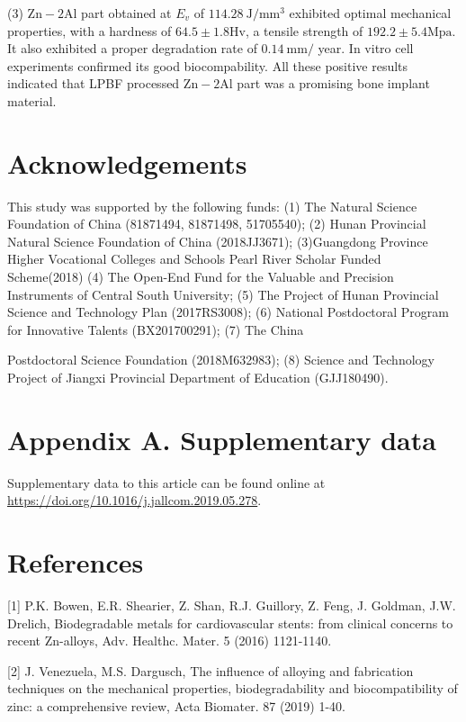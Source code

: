 \documentclass[10pt]{article}
\begin{document}
(3) $\mathrm{Zn}-2 \mathrm{Al}$ part obtained at $E_{v}$ of $114.28 \mathrm{~J} / \mathrm{mm}^{3}$ exhibited optimal mechanical properties, with a hardness of $64.5 \pm 1.8 \mathrm{Hv}$, a tensile strength of $192.2 \pm 5.4 \mathrm{Mpa}$. It also exhibited a proper degradation rate of $0.14 \mathrm{~mm} /$ year. In vitro cell experiments confirmed its good biocompability. All these positive results indicated that LPBF processed $\mathrm{Zn}-2 \mathrm{Al}$ part was a promising bone implant material.

\section*{Acknowledgements}
This study was supported by the following funds: (1) The Natural Science Foundation of China (81871494, 81871498, 51705540); (2) Hunan Provincial Natural Science Foundation of China (2018JJ3671); (3)Guangdong Province Higher Vocational Colleges and Schools Pearl River Scholar Funded Scheme(2018) (4) The Open-End Fund for the Valuable and Precision Instruments of Central South University; (5) The Project of Hunan Provincial Science and Technology Plan (2017RS3008); (6) National Postdoctoral Program for Innovative Talents (BX201700291); (7) The China

Postdoctoral Science Foundation (2018M632983); (8) Science and Technology Project of Jiangxi Provincial Department of Education (GJJ180490).

\section*{Appendix A. Supplementary data}
Supplementary data to this article can be found online at \href{https://doi.org/10.1016/j.jallcom.2019.05.278}{https://doi.org/10.1016/j.jallcom.2019.05.278}.

\section*{References}
[1] P.K. Bowen, E.R. Shearier, Z. Shan, R.J. Guillory, Z. Feng, J. Goldman, J.W. Drelich, Biodegradable metals for cardiovascular stents: from clinical concerns to recent Zn-alloys, Adv. Healthc. Mater. 5 (2016) 1121-1140.

[2] J. Venezuela, M.S. Dargusch, The influence of alloying and fabrication techniques on the mechanical properties, biodegradability and biocompatibility of zinc: a comprehensive review, Acta Biomater. 87 (2019) 1-40.
\end{document}
